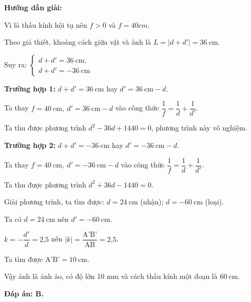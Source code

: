 {
\begin{center}
	\textbf{Hướng dẫn giải:}
\end{center}

{Vì là thấu kính hội tụ nên $f>0$ và $f=40 cm$.

Theo giả thiết, khoảng cách giữa vật và ảnh là $L=\left|d+d' \right|= 36 \ \text{cm}$. 

Suy ra: $\begin{cases} d+d'=36\ \text{cm}, \\ d+d'=-36\ \text{cm}\end{cases}$
	
	\textbf{Trường hợp 1:} $d+d'=36\ \text{cm}$ hay $d'=36\ \text{cm}-d$. 
	
	Ta thay $f=40\ \text{cm},\ d'=36\ \text{cm} -d$ vào công thức $\dfrac{1}{f}=\dfrac{1}{d}+\dfrac{1}{d'}$. 
	
	Ta thu được phương trình $d^2-36d+1440=0$, phương trình này vô nghiệm.
	
	\textbf{Trường hợp 2:} $d+d'=-36\ \text{cm}$ hay $d'=-36\ \text{cm}-d$. 
	
	Ta thay $f=40\ \text{cm},\ d'=-36\ \text{cm} -d$ vào công thức $\dfrac{1}{f}=\dfrac{1}{d}+\dfrac{1}{d'}$. 
	
	Ta thu được phương trình $d^2+36d-1440=0$.
	
	Giải phương trình, ta tìm được: $d= 24\ \text{cm}$ (nhận); $d= -\text{60}\ \text{cm}$ (loại).
	
	Ta có $d= 24\ \text{cm}$ nên $d'=-60 \ \text{cm}$.
	
$k=-\dfrac{d'}{d}=\text{2,5}$ nên $\left| k\right|=\dfrac{\text{A'B'}}{\text{AB}}=\text{2,5}$.

Ta tìm được $\text{A'B'}=10\ \text{cm}$.
	
	Vậy ảnh là ảnh ảo, có độ lớn 10 mm và cách thấu kính một đoạn là $60\ \text{cm}$.
	
\textbf{	Đáp án: B.}
} }

